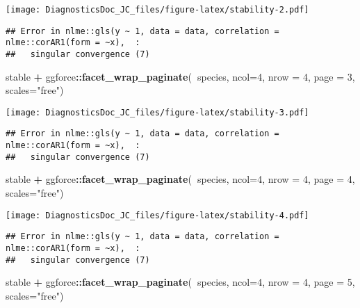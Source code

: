 \documentclass[
]{article}
\newenvironment{Shaded}{\begin{snugshade}}{\end{snugshade}}
\newcommand{\DataTypeTok}[1]{\textcolor[rgb]{0.13,0.29,0.53}{#1}}
\newcommand{\DecValTok}[1]{\textcolor[rgb]{0.00,0.00,0.81}{#1}}
\newcommand{\KeywordTok}[1]{\textcolor[rgb]{0.13,0.29,0.53}{\textbf{#1}}}
\newcommand{\NormalTok}[1]{#1}
\newcommand{\OperatorTok}[1]{\textcolor[rgb]{0.81,0.36,0.00}{\textbf{#1}}}
\newcommand{\StringTok}[1]{\textcolor[rgb]{0.31,0.60,0.02}{#1}}
\begin{document}
\texttt{[image: DiagnosticsDoc\_JC\_files/figure-latex/stability-2.pdf]}

\begin{verbatim}
## Error in nlme::gls(y ~ 1, data = data, correlation = nlme::corAR1(form = ~x),  : 
##   singular convergence (7)
\end{verbatim}

\begin{Shaded}
\begin{Highlighting}[]
\NormalTok{stable }\OperatorTok{+}\StringTok{ }\NormalTok{ggforce}\OperatorTok{::}\KeywordTok{facet_wrap_paginate}\NormalTok{(}\OperatorTok{~}\NormalTok{species, }\DataTypeTok{ncol=}\DecValTok{4}\NormalTok{, }\DataTypeTok{nrow =} \DecValTok{4}\NormalTok{, }\DataTypeTok{page =} \DecValTok{3}\NormalTok{, }\DataTypeTok{scales=}\StringTok{"free"}\NormalTok{)}
\end{Highlighting}
\end{Shaded}

\texttt{[image: DiagnosticsDoc\_JC\_files/figure-latex/stability-3.pdf]}

\begin{verbatim}
## Error in nlme::gls(y ~ 1, data = data, correlation = nlme::corAR1(form = ~x),  : 
##   singular convergence (7)
\end{verbatim}

\begin{Shaded}
\begin{Highlighting}[]
\NormalTok{stable }\OperatorTok{+}\StringTok{ }\NormalTok{ggforce}\OperatorTok{::}\KeywordTok{facet_wrap_paginate}\NormalTok{(}\OperatorTok{~}\NormalTok{species, }\DataTypeTok{ncol=}\DecValTok{4}\NormalTok{, }\DataTypeTok{nrow =} \DecValTok{4}\NormalTok{, }\DataTypeTok{page =} \DecValTok{4}\NormalTok{, }\DataTypeTok{scales=}\StringTok{"free"}\NormalTok{)}
\end{Highlighting}
\end{Shaded}

\texttt{[image: DiagnosticsDoc\_JC\_files/figure-latex/stability-4.pdf]}

\begin{verbatim}
## Error in nlme::gls(y ~ 1, data = data, correlation = nlme::corAR1(form = ~x),  : 
##   singular convergence (7)
\end{verbatim}

\begin{Shaded}
\begin{Highlighting}[]
\NormalTok{stable }\OperatorTok{+}\StringTok{ }\NormalTok{ggforce}\OperatorTok{::}\KeywordTok{facet_wrap_paginate}\NormalTok{(}\OperatorTok{~}\NormalTok{species, }\DataTypeTok{ncol=}\DecValTok{4}\NormalTok{, }\DataTypeTok{nrow =} \DecValTok{4}\NormalTok{, }\DataTypeTok{page =} \DecValTok{5}\NormalTok{, }\DataTypeTok{scales=}\StringTok{"free"}\NormalTok{)}
\end{Highlighting}
\end{Shaded}
\end{document}
